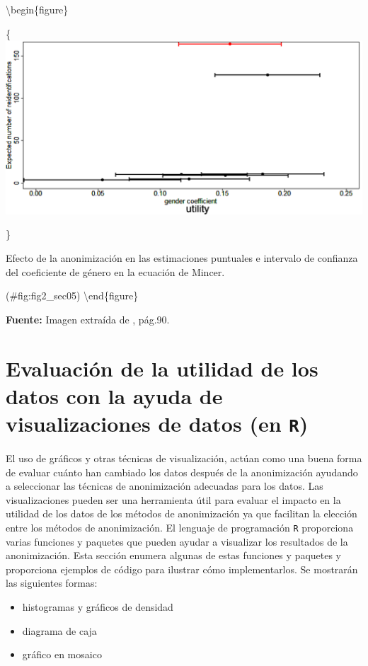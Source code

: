 \documentclass[]{book}
\providecommand{\tightlist}{%
  \setlength{\itemsep}{0pt}\setlength{\parskip}{0pt}}
\theoremstyle{definition}
\theoremstyle{definition}
\theoremstyle{definition}
\theoremstyle{definition}
\theoremstyle{remark}
\begin{document}
\textbackslash{}begin\{figure\}

\{\centering \includegraphics[width=0.9\linewidth]{Imagenes/fig2}

\}

\caption{Efecto de la anonimización en las estimaciones puntuales e intervalo de confianza del coeficiente de género en la ecuación de Mincer.}

(\#fig:fig2\_sec05)
\textbackslash{}end\{figure\}

\textbf{Fuente:} Imagen extraída de \citep{benschop2021}, pág.90.

\hypertarget{evaluaciuxf3n-de-la-utilidad-de-los-datos-con-la-ayuda-de-visualizaciones-de-datos-en-r}{%
\section{\texorpdfstring{Evaluación de la utilidad de los datos con la ayuda de visualizaciones de datos (en \texttt{R})}{Evaluación de la utilidad de los datos con la ayuda de visualizaciones de datos (en R)}}\label{evaluaciuxf3n-de-la-utilidad-de-los-datos-con-la-ayuda-de-visualizaciones-de-datos-en-r}}

El uso de gráficos y otras técnicas de visualización, actúan como una buena forma de evaluar cuánto han cambiado los datos después de la anonimización ayudando a seleccionar las técnicas de anonimización adecuadas para los datos. Las visualizaciones pueden ser una herramienta útil para evaluar el impacto en la utilidad de los datos de los métodos de anonimización ya que facilitan la elección entre los métodos de anonimización. El lenguaje de programación \texttt{R} proporciona varias funciones y paquetes que pueden ayudar a visualizar los resultados de la
anonimización. Esta sección enumera algunas de estas funciones y paquetes y proporciona ejemplos de código para ilustrar cómo implementarlos. Se mostrarán las siguientes formas:

\begin{itemize}
\tightlist
\item
  histogramas y gráficos de densidad
\item
  diagrama de caja
\item
  gráfico en mosaico
\end{itemize}
\end{document}
